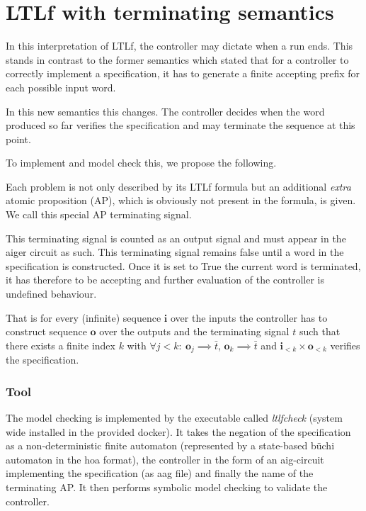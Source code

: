 \documentclass[11pt]{article}
\begin{document}
\section{LTLf with terminating semantics}

In this interpretation of LTLf, the controller may dictate when a run ends.
This stands in contrast to the former semantics which stated that for a controller
to correctly implement a specification, it has to generate a finite accepting
prefix for each possible input word.

In this new semantics this changes. The controller decides when the word produced
so far verifies the specification and may terminate the sequence at this point.

To implement and model check this, we propose the following.

Each problem is not only described by its LTLf formula but an additional
\textit{extra} atomic proposition (AP), which is obviously not present in
the formula, is given.
We call this special AP terminating signal.

This terminating signal is counted as an output signal and must appear
in the aiger circuit as such.
This terminating signal remains false until a word in the specification
is constructed.
Once it is set to True the current word is terminated, it has therefore
to be accepting and further evaluation of the controller
is undefined behaviour.

That is for every (infinite) sequence $\mathbf{i}$ over the inputs the
controller has to construct sequence $\mathbf{o}$ over the
outputs and the terminating signal $t$ such that there exists a finite
index $k$ with $\forall j < k\colon\ \mathbf{o}_{j} \implies \bar{t}$,
$\mathbf{o}_{k} \implies \bar{t}$ and $\mathbf{i}_{<k}\times\mathbf{o}_{<k}$
verifies the specification.

\subsubsection*{Tool}

The model checking is implemented by the executable called
\textit{ltlfcheck} (system wide installed in the provided docker).
It takes the negation of the specification as a non-deterministic
finite automaton (represented by a state-based büchi automaton in
the hoa format), the controller in the form of an aig-circuit
implementing the specification (as aag file) and finally the name
of the terminating AP.
It then performs symbolic model checking to validate the controller.
\end{document}
